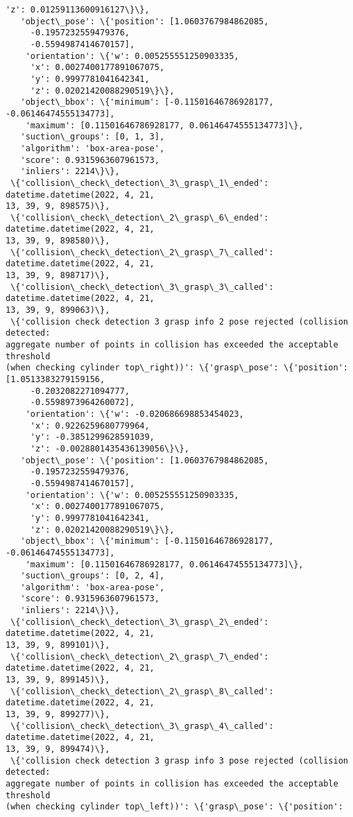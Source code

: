 \documentclass[11pt]{article}
\begin{document}
\begin{tcolorbox}[breakable, size=fbox, boxrule=.5pt, pad at break*=1mm, opacityfill=0]
\begin{Verbatim}[commandchars=\\\{\}]
     'z': 0.01259113600916127\}\},
   'object\_pose': \{'position': [1.0603767984862085,
     -0.1957232559479376,
     -0.5594987414670157],
    'orientation': \{'w': 0.005255551250903335,
     'x': 0.0027400177891067075,
     'y': 0.9997781041642341,
     'z': 0.02021420088290519\}\},
   'object\_bbox': \{'minimum': [-0.11501646786928177, -0.06146474555134773],
    'maximum': [0.11501646786928177, 0.06146474555134773]\},
   'suction\_groups': [0, 1, 3],
   'algorithm': 'box-area-pose',
   'score': 0.9315963607961573,
   'inliers': 2214\}\},
 \{'collision\_check\_detection\_3\_grasp\_1\_ended': datetime.datetime(2022, 4, 21,
13, 39, 9, 898575)\},
 \{'collision\_check\_detection\_2\_grasp\_6\_ended': datetime.datetime(2022, 4, 21,
13, 39, 9, 898580)\},
 \{'collision\_check\_detection\_2\_grasp\_7\_called': datetime.datetime(2022, 4, 21,
13, 39, 9, 898717)\},
 \{'collision\_check\_detection\_3\_grasp\_3\_called': datetime.datetime(2022, 4, 21,
13, 39, 9, 899063)\},
 \{'collision check detection 3 grasp info 2 pose rejected (collision detected:
aggregate number of points in collision has exceeded the acceptable threshold
(when checking cylinder top\_right))': \{'grasp\_pose': \{'position':
[1.0513383279159156,
     -0.2032082271094777,
     -0.5598973964260072],
    'orientation': \{'w': -0.020686698853454023,
     'x': 0.9226259680779964,
     'y': -0.3851299628591039,
     'z': -0.0028801435436139056\}\},
   'object\_pose': \{'position': [1.0603767984862085,
     -0.1957232559479376,
     -0.5594987414670157],
    'orientation': \{'w': 0.005255551250903335,
     'x': 0.0027400177891067075,
     'y': 0.9997781041642341,
     'z': 0.02021420088290519\}\},
   'object\_bbox': \{'minimum': [-0.11501646786928177, -0.06146474555134773],
    'maximum': [0.11501646786928177, 0.06146474555134773]\},
   'suction\_groups': [0, 2, 4],
   'algorithm': 'box-area-pose',
   'score': 0.9315963607961573,
   'inliers': 2214\}\},
 \{'collision\_check\_detection\_3\_grasp\_2\_ended': datetime.datetime(2022, 4, 21,
13, 39, 9, 899101)\},
 \{'collision\_check\_detection\_2\_grasp\_7\_ended': datetime.datetime(2022, 4, 21,
13, 39, 9, 899145)\},
 \{'collision\_check\_detection\_2\_grasp\_8\_called': datetime.datetime(2022, 4, 21,
13, 39, 9, 899277)\},
 \{'collision\_check\_detection\_3\_grasp\_4\_called': datetime.datetime(2022, 4, 21,
13, 39, 9, 899474)\},
 \{'collision check detection 3 grasp info 3 pose rejected (collision detected:
aggregate number of points in collision has exceeded the acceptable threshold
(when checking cylinder top\_left))': \{'grasp\_pose': \{'position':

\end{Verbatim}
\end{tcolorbox}
\end{document}
